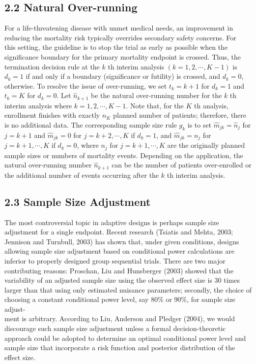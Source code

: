 \documentclass[10pt]{article}
\begin{document}
\subsection*{2.2 Natural Over-running}
For a life-threatening disease with unmet medical needs, an improvement in reducing the mortality risk typically overrides secondary safety concerns. For\\
this setting, the guideline is to stop the trial as early as possible when the significance boundary for the primary mortality endpoint is crossed. Thus, the termination decision rule at the $k$ th interim analysis $(k=1,2, \cdots, K-1)$ is $d_{k}=1$ if and only if a boundary (significance or futility) is crossed, and $d_{k}=0$, otherwise. To resolve the issue of over-running, we set $t_{k}=k+1$ for $d_{k}=1$ and $t_{k}=K$ for $d_{k}=0$. Let $\hat{n}_{k+1}$ be the natural over-running number for the $k$ th interim analysis where $k=1,2, \cdots, K-1$. Note that, for the $K$ th analysis, enrollment finishes with exactly $n_{K}$ planned number of patients; therefore, there is no additional data. The corresponding sample size rule $g_{k}$ is to set $\hat{m}_{j k}=\hat{n}_{j}$ for $j=k+1$ and $\hat{m}_{j k}=0$ for $j=k+2, \cdots, K$ if $d_{k}=1$, and $\hat{m}_{j k}=n_{j}$ for $j=k+1, \cdots, K$ if $d_{k}=0$, where $n_{j}$ for $j=k+1, \cdots, K$ are the originally planned sample sizes or numbers of mortality events. Depending on the application, the natural over-running number $\hat{n}_{k+1}$ can be the number of patients over-enrolled or the additional number of events occurring after the $k$ th interim analysis.

\subsection*{2.3 Sample Size Adjustment}
The most controversial topic in adaptive designs is perhaps sample size adjustment for a single endpoint. Recent research (Tsiatis and Mehta, 2003; Jennison and Turnbull, 2003) has shown that, under given conditions, designs allowing sample size adjustment based on conditional power calculations are inferior to properly designed group sequential trials. There are two major contributing reasons: Proschan, Liu and Hunsberger (2003) showed that the variability of an adjusted sample size using the observed effect size is 30 times larger than that using only estimated nuisance parameters; secondly, the choice of choosing a constant conditional power level, say 80\% or 90\%, for sample size adjust-\\
ment is arbitrary. According to Liu, Anderson and Pledger (2004), we would discourage such sample size adjustment unless a formal decision-theoretic approach could be adopted to determine an optimal conditional power level and sample size that incorporate a risk function and posterior distribution of the effect size.
\end{document}
